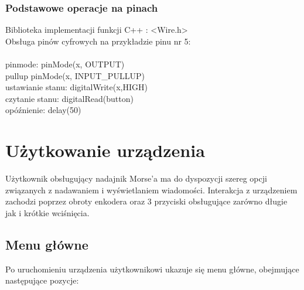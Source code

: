 \documentclass{article}
\begin{document}
\subsubsection{Podstawowe operacje na pinach}

Biblioteka implementacji funkcji C++ : <Wire.h>\\
Obsługa pinów cyfrowych na przykładzie pinu nr 5:\\~\\

pinmode: 			pinMode(x, OUTPUT)\\
pullup				pinMode(x, INPUT\_PULLUP)\\
ustawianie stanu: 		digitalWrite(x,HIGH)\\
czytanie stanu: 			digitalRead(button)\\
opóźnienie: 			delay(50)\\

\section{Użytkowanie urządzenia}
Użytkownik obsługujący nadajnik Morse'a ma do dyspozycji szereg opcji związanych z nadawaniem i wyświetlaniem wiadomości. Interakcja z urządzeniem zachodzi poprzez obroty enkodera oraz 3 przyciski obsługujące zarówno długie jak i krótkie wciśnięcia.

\subsection{Menu główne}
Po uruchomieniu urządzenia użytkownikowi ukazuje się menu główne, obejmujące następujące pozycje:
\end{document}

